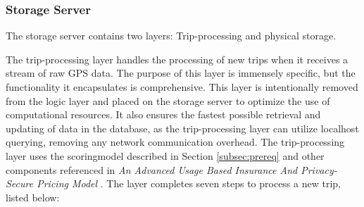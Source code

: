 \subsubsection{Storage Server}\label{subsec:storageserver}
The storage server contains two layers: Trip-processing and physical storage.

The trip-processing layer handles the processing of new trips when it receives a stream of raw GPS data. The purpose of this layer is immensely specific, but the functionality it encapsulates is comprehensive. This layer is intentionally removed from the logic layer and placed on the storage server to optimize the use of computational resources. It also ensures the fastest possible retrieval and updating of data in the database, as the trip-processing layer can utilize localhost querying, removing any network communication overhead. The trip-processing layer uses the scoringmodel described in Section \ref{subsec:prereq} and other components referenced in \textit{An Advanced Usage Based Insurance And Privacy-Secure Pricing Model} \cite{sw9_report}. The layer completes seven steps to process a new trip, listed below:

